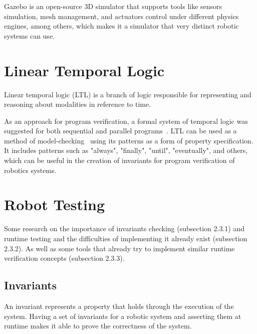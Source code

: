 Gazebo is an open-source 3D simulator that supports tools like sensors simulation, mesh management, and actuators control under different physics engines, among others, which makes it a simulator that very distinct robotic systems can use.

\section{Linear Temporal Logic}
\label{sec:ltl}

Linear temporal logic (LTL) is a branch of logic responsible for representing and reasoning about modalities in reference to time. 

As an approach for program verification, a formal system of temporal logic was suggested for both sequential and parallel programs~\cite{pnueli1977temporal}. LTL can be used as a method of model-checking~\cite{dwyer1998property} using its patterns as a form of property specification. It includes patterns such as "always", "finally", "until", "eventually", and others, which can be useful in the creation of invariants for program verification of robotics systems.

\section{Robot Testing}
\label{sec:robottesting}

Some research on the importance of invariants checking (subsection 2.3.1) and runtime testing and the difficulties of implementing it already exist (subsection 2.3.2). As well as some tools that already try to implement similar runtime verification concepts (subsection 2.3.3).


\subsection{Invariants}

An invariant represents a property that holds through the execution of the system. Having a set of invariants for a robotic system and asserting them at runtime makes it able to prove the correctness of the system.

